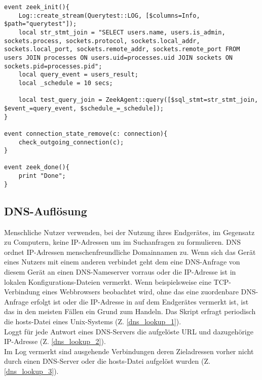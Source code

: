 \begin{lstlisting}[caption={Abfrage und Abgleich der Ports },consecutivenumbers=false,lastline=77,firstnumber=52,numberblanklines=false,linerange={52-55,62-70,76-77}]
event zeek_init(){
	Log::create_stream(Querytest::LOG, [$columns=Info, $path="querytest"]);
    local str_stmt_join = "SELECT users.name, users.is_admin, sockets.process, sockets.protocol, sockets.local_addr, sockets.local_port, sockets.remote_addr, sockets.remote_port FROM users JOIN processes ON users.uid=processes.uid JOIN sockets ON sockets.pid=processes.pid";
    local query_event = users_result;
    local _schedule = 10 secs;
    
    local test_query_join = ZeekAgent::query([$sql_stmt=str_stmt_join, $event_=query_event, $schedule_=_schedule]);
}

event connection_state_remove(c: connection){
    check_outgoing_connection(c);
}

event zeek_done(){
    print "Done";
}
\end{lstlisting}
\subsection{DNS-Auflösung}
Menschliche Nutzer verwenden, bei der Nutzung ihres Endgerätes, im Gegensatz zu Computern, keine IP-Adressen um im Suchanfragen zu formulieren. DNS ordnet IP-Adressen menschenfreundliche Domainnamen zu. Wenn sich das Gerät eines Nutzers mit einem anderen verbindet geht dem eine DNS-Anfrage von diesem Gerät an einen DNS-Nameserver vorraus oder die IP-Adresse ist in lokalen Konfigurations-Dateien vermerkt. Wenn beispielsweise eine TCP-Verbindung eines Webbrowsers beobachtet wird, ohne das eine zuordenbare DNS-Anfrage erfolgt ist oder die IP-Adresse in auf dem Endgerätes vermerkt ist, ist das in den meisten Fällen ein Grund zum Handeln.
Das Skript erfragt periodisch die hosts-Datei eines Unix-Systems (Z. \ref{dns_lookup_1}).\\
Loggt für jede Antwort eines DNS-Servers die aufgelöste URL und dazugehörige IP-Adresse (Z. \ref{dns_lookup_2}).\\
Im Log vermerkt sind ausgehende Verbindungen deren Zieladressen vorher nicht durch einen DNS-Server oder die hosts-Datei aufgelöst wurden (Z. \ref{dns_lookup_3}).

